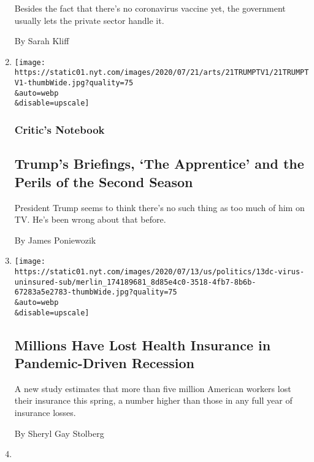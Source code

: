 \begin{enumerate}
  Besides the fact that there's no coronavirus vaccine yet, the
  government usually lets the private sector handle it.

  By Sarah Kliff
\item
  \href{/2020/07/21/arts/television/trump-briefings.html}{}

  \texttt{[image: https://static01.nyt.com/images/2020/07/21/arts/21TRUMPTV1/21TRUMPTV1-thumbWide.jpg?quality=75\\\&auto=webp\\\&disable=upscale]}

  \hypertarget{critics-notebook}{%
  \subsubsection{Critic's Notebook}\label{critics-notebook}}

  \hypertarget{trumps-briefings-the-apprentice-and-the-perils-of-the-second-season}{%
  \subsection{Trump's Briefings, `The Apprentice' and the Perils of the
  Second
  Season}\label{trumps-briefings-the-apprentice-and-the-perils-of-the-second-season}}

  President Trump seems to think there's no such thing as too much of
  him on TV. He's been wrong about that before.

  By James Poniewozik
\item
  \href{/2020/07/13/us/politics/coronavirus-health-insurance-trump.html}{}

  \texttt{[image: https://static01.nyt.com/images/2020/07/13/us/politics/13dc-virus-uninsured-sub/merlin\_174189681\_8d85e4c0-3518-4fb7-8b6b-67283a5e2783-thumbWide.jpg?quality=75\\\&auto=webp\\\&disable=upscale]}

  \hypertarget{millions-have-lost-health-insurance-in-pandemic-driven-recession}{%
  \subsection{Millions Have Lost Health Insurance in Pandemic-Driven
  Recession}\label{millions-have-lost-health-insurance-in-pandemic-driven-recession}}

  A new study estimates that more than five million American workers
  lost their insurance this spring, a number higher than those in any
  full year of insurance losses.

  By Sheryl Gay Stolberg
\item
  \href{/2020/07/05/nyregion/nj-migrant-workers-covid-19.html}{}


\end{enumerate}
